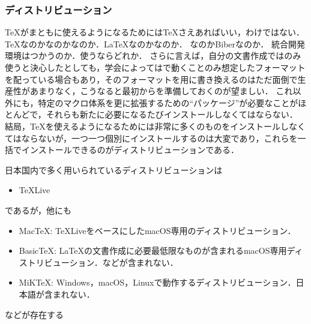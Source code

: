 \documentclass[./main]{subfiles}
\begin{document}
\subsubsection{ディストリビューション}
\noindent
\TeX がまともに使えるようになるためには\TeX さえあればいい，わけではない．
\TeX なのか\pTeX なのか\LuaTeX なのか．\LaTeX なのか\ConTeXt なのか．
\BibTeX なのかBiberなのか．
統合開発環境はつかうのか．使うならどれか．
さらに言えば，自分の文書作成では\LuaLaTeX のみ使うと決心したとしても，学会によっては\upLaTeX で動くことのみ想定したフォーマットを配っている場合もあり，そのフォーマットを\LuaLaTeX 用に書き換えるのはただ面倒で生産性があまりなく，こうなると最初から\upLaTeX を準備しておくのが望ましい．
これ以外にも，特定のマクロ体系を更に拡張するための``パッケージ''が必要なことがほとんどで，それらも新たに必要になるたびインストールしなくてはならない．
結局，\TeX を使えるようになるためには非常に多くのものをインストールしなくてはならないが，一つ一つ個別にインストールするのは大変であり，これらを一括でインストールできるのがディストリビューションである．

日本国内で多く用いられているディストリビューションは
\begin{itemize}
  \item \TeX Live\supercite{TeXLive_Acetaminophen}
\end{itemize}
であるが，他にも
\begin{itemize}
  \item Mac\TeX : \TeX LiveをベースにしたmacOS専用のディストリビューション．
  \item Basic\TeX : \LaTeX の文書作成に必要最低限なものが含まれるmacOS専用ディストリビューション．\epTeX などが含まれない．
  \item MiK\TeX : Windows，macOS，Linuxで動作するディストリビューション．日本語\pTeX が含まれない．
\end{itemize}
などが存在する


\ifSubfilesClassLoaded{%
  \printbibliography
}{}
\end{document}
